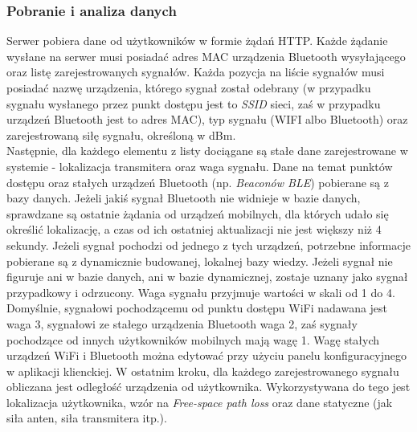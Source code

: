 \subsubsection{Pobranie i analiza danych}
Serwer pobiera dane od użytkowników w formie żądań HTTP. Każde żądanie wysłane na serwer musi posiadać adres MAC urządzenia Bluetooth wysyłającego oraz listę zarejestrowanych sygnałów. Każda pozycja na liście sygnałów musi posiadać nazwę urządzenia, którego sygnał został odebrany (w przypadku sygnału wysłanego przez punkt dostępu jest to \textit{SSID} sieci, zaś w przypadku urządzeń Bluetooth jest to adres MAC), typ sygnału (WIFI albo Bluetooth) oraz zarejestrowaną siłę sygnału, określoną w dBm. \\
Następnie, dla każdego elementu z listy dociągane są stałe dane zarejestrowane w systemie - lokalizacja transmitera oraz waga sygnału. Dane na temat punktów dostępu oraz stałych urządzeń Bluetooth (np. \textit{Beaconów BLE}) pobierane są z bazy danych. Jeżeli jakiś sygnał Bluetooth nie widnieje w bazie danych, sprawdzane są ostatnie żądania od urządzeń mobilnych, dla których udało się określić lokalizację, a czas od ich ostatniej aktualizacji nie jest większy niż 4 sekundy. Jeżeli sygnał pochodzi od jednego z tych urządzeń, potrzebne informacje pobierane są z dynamicznie budowanej, lokalnej bazy wiedzy. Jeżeli sygnał nie figuruje ani w bazie danych, ani w bazie dynamicznej, zostaje uznany jako sygnał przypadkowy i odrzucony. Waga sygnału przyjmuje wartości w skali od 1 do 4. Domyślnie, sygnałowi pochodzącemu od punktu dostępu WiFi nadawana jest waga 3, sygnałowi ze stałego urządzenia Bluetooth waga 2, zaś sygnały pochodzące od innych użytkowników mobilnych mają wagę 1. Wagę stałych urządzeń WiFi i Bluetooth można edytować przy użyciu panelu konfiguracyjnego w aplikacji klienckiej. W ostatnim kroku, dla każdego zarejestrowanego sygnału obliczana jest odległość urządzenia od użytkownika. Wykorzystywana do tego jest lokalizacja użytkownika, wzór na \textit{Free-space path loss} oraz dane statyczne (jak siła anten, siła transmitera itp.).\\
